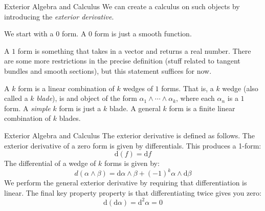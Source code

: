 \documentclass{beamer}
\begin{document}
    \begin{frame}{Exterior Algebra and Calculus}
        We can create a calculus on such objects by introducing the
        \textit{exterior derivative}.
        \par\hfill\par
        We start with a $0$ form. A $0$ form is just a smooth function.
        \par\hfill\par
        A $1$ form is something that takes in a
        vector and returns a real number. There are some more restrictions in
        the precise definition (stuff related to tangent bundles and smooth
        sections), but this statement suffices for now.
        \par\hfill\par
        A $k$ form is a linear combination of $k$ wedges of $1$ forms. That is,
        a $k$ wedge (also called a $k$ \textit{blade}), is and object of the
        form $\alpha_{1}\land\cdots\land\alpha_{k}$, where each $\alpha_{n}$
        is a $1$ form. A \textit{simple} $k$ form is just a $k$ blade.
        A general $k$ form is a finite linear combination of $k$ blades.
    \end{frame}
    \begin{frame}{Exterior Algebra and Calculus}
        The exterior derivative is defined as follows.
        The exterior derivative of
        a zero form is given by differentials. This produces a 1-form:
        \[
            \textrm{d}(f)=\textrm{d}f
        \]
        The differential of a wedge of $k$ forms is given by:
        \[
            d\left(\alpha\land\beta\right)
            =\textrm{d}\alpha\land\beta
            +(-1)^{k}\alpha\land\textrm{d}\beta
        \]
        We perform the general exterior derivative by requiring that
        differentiation is linear. The final key property property is
        that differentiating twice gives you zero:
        \[
            \textrm{d}\left(\textrm{d}\alpha\right)=\textrm{d}^{2}\alpha=0
        \]
    \end{frame}
\end{document}
